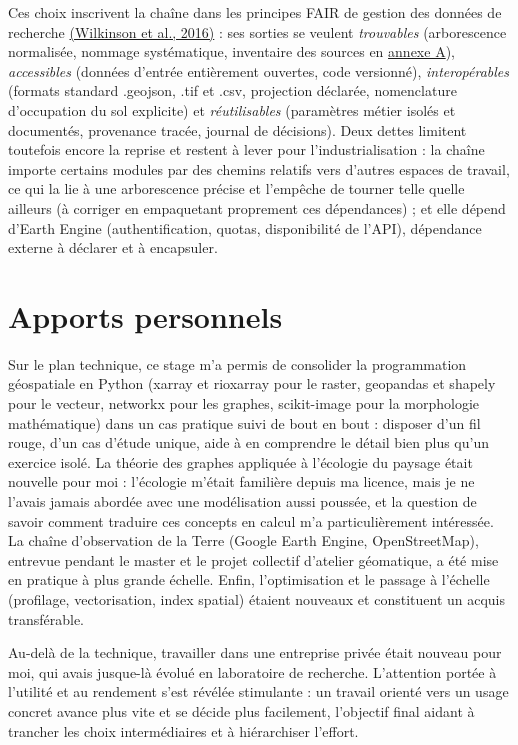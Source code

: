 \documentclass[a4paper,11pt]{report}
\begin{document}
Ces choix inscrivent la chaîne dans les principes FAIR de gestion des données de recherche \hyperref[sec:bibliographie]{(Wilkinson et al., 2016)} : ses sorties se veulent \textit{trouvables} (arborescence normalisée, nommage systématique, inventaire des sources en \hyperref[annexe:A]{annexe A}), \textit{accessibles} (données d'entrée entièrement ouvertes, code versionné), \textit{interopérables} (formats standard .geojson, .tif et .csv, projection déclarée, nomenclature d'occupation du sol explicite) et \textit{réutilisables} (paramètres métier isolés et documentés, provenance tracée, journal de décisions). Deux dettes limitent toutefois encore la reprise et restent à lever pour l'industrialisation : la chaîne importe certains modules par des chemins relatifs vers d'autres espaces de travail, ce qui la lie à une arborescence précise et l'empêche de tourner telle quelle ailleurs (à corriger en empaquetant proprement ces dépendances) ; et elle dépend d'Earth Engine (authentification, quotas, disponibilité de l'API), dépendance externe à déclarer et à encapsuler.

\section{Apports personnels}\label{sec:6.7}

Sur le plan technique, ce stage m'a permis de consolider la programmation géospatiale en Python (xarray et rioxarray pour le raster, geopandas et shapely pour le vecteur, networkx pour les graphes, scikit-image pour la morphologie mathématique) dans un cas pratique suivi de bout en bout : disposer d'un fil rouge, d'un cas d'étude unique, aide à en comprendre le détail bien plus qu'un exercice isolé. La théorie des graphes appliquée à l'écologie du paysage était nouvelle pour moi : l'écologie m'était familière depuis ma licence, mais je ne l'avais jamais abordée avec une modélisation aussi poussée, et la question de savoir comment traduire ces concepts en calcul m'a particulièrement intéressée. La chaîne d'observation de la Terre (Google Earth Engine, OpenStreetMap), entrevue pendant le master et le projet collectif d'atelier géomatique, a été mise en pratique à plus grande échelle. Enfin, l'optimisation et le passage à l'échelle (profilage, vectorisation, index spatial) étaient nouveaux et constituent un acquis transférable.

Au-delà de la technique, travailler dans une entreprise privée était nouveau pour moi, qui avais jusque-là évolué en laboratoire de recherche. L'attention portée à l'utilité et au rendement s'est révélée stimulante : un travail orienté vers un usage concret avance plus vite et se décide plus facilement, l'objectif final aidant à trancher les choix intermédiaires et à hiérarchiser l'effort.
\end{document}
